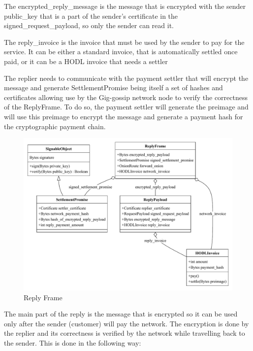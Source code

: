 \documentclass{article}
\begin{document}
The encrypted\_reply\_message is the message that is encrypted with the sender public\_key that is a part of the sender's certificate in the signed\_request\_payload, so only the sender can read it.

The reply\_invoice is the invoice that must be used by the sender to pay for the service. It can be either a standard invoice, that is automatically settled once paid, or it can be a HODL invoice that needs a settler 

The replier needs to communicate with the payment settler that will encrypt the message and generate SettlementPromise being itself a set of hashes and certificates allowing use by the Gig-gossip network node to verify the correctness of the ReplyFrame. To do so, the payment settler will generate the preimage and will use this preimage to encrypt the message and generate a payment hash for the cryptographic payment chain. 





\begin{figure}
	\centering
	\includegraphics[scale=0.7]{ReplyFrame.pdf}
	\caption{Reply Frame}
	\label{fig:fr:replyframe}
\end{figure}

The main part of the reply is the message that is encrypted so it can be used only after the sender (customer) will pay the network. The encryption is done by the replier and its correctness is verified by the network while travelling back to the sender. This is done in the following way:
\end{document}
